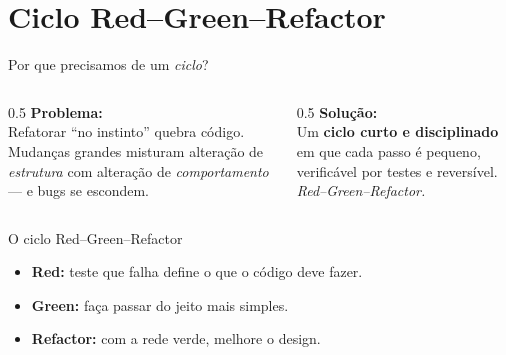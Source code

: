 \documentclass[aspectratio=169]{beamer}
\begin{document}
\section{Ciclo Red--Green--Refactor}

\begin{frame}{Por que precisamos de um \emph{ciclo}?}
  \begin{columns}[T]
    \begin{column}{0.5\textwidth}
      \textbf{Problema:}\\[0.4em]
      Refatorar ``no instinto'' quebra código.
      Mudanças grandes misturam alteração de
      \emph{estrutura} com alteração de
      \emph{comportamento} --- e bugs se escondem.
    \end{column}
    \begin{column}{0.5\textwidth}
      \textbf{Solução:}\\[0.4em]
      Um \textbf{ciclo curto e disciplinado} em que
      cada passo é pequeno, verificável por testes e
      reversível. \emph{Red--Green--Refactor.}
    \end{column}
  \end{columns}
\end{frame}

\begin{frame}{O ciclo Red--Green--Refactor}
  \begin{center}
  \end{center}
  \begin{itemize}\footnotesize
    \item \textbf{Red:} teste que falha define o que o código deve fazer.
    \item \textbf{Green:} faça passar do jeito mais simples.
    \item \textbf{Refactor:} com a rede verde, melhore o design.
  \end{itemize}
\end{frame}
\end{document}
